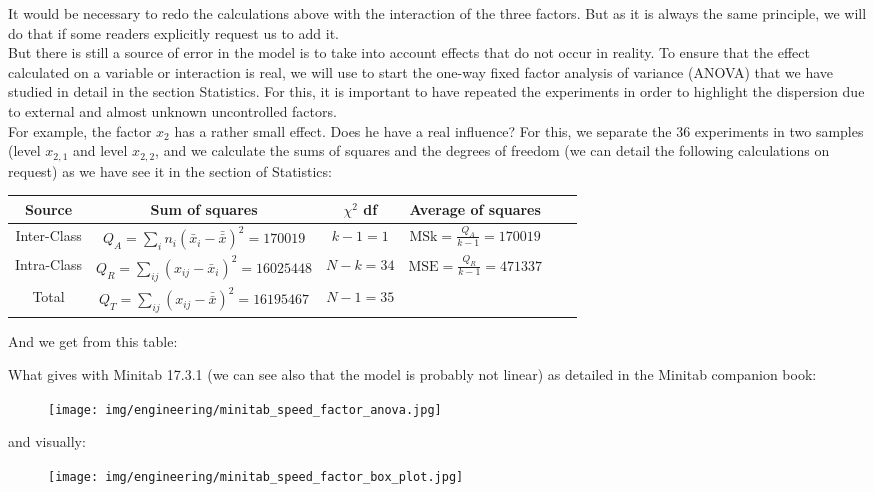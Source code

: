 	It would be necessary to redo the calculations above with the interaction of the three factors. But as it is always the same principle, we will do that if some readers explicitly request us to add it.\\

	But there is still a source of error in the model is to take into account effects that do not occur in reality. To ensure that the effect calculated on a variable or interaction is real, we will use to start the one-way fixed factor analysis of variance (ANOVA) that we have studied in detail in the section Statistics. For this, it is important to have repeated the experiments in order to highlight the dispersion due to external and almost unknown uncontrolled factors.\\

	For example, the factor $x_2$ has a rather small effect. Does he have a real influence? For this, we separate the $36$ experiments in two samples (level $x_{2,1}$ and level $x_{2,2}$, and we calculate the sums of squares and the degrees of freedom (we can detail the following calculations on request) as we have see it in the section of Statistics:
	\begin{table}[H]\small
	\renewcommand{\arraystretch}{1.2}
	\begin{tabular}{cccccc}\hline
	Source & Sum of squares & $\chi^2$ df & Average of squares \\ \hline
	Inter-Class & $Q_A=\displaystyle\sum_{i}n_i\left(\bar{x}_{i}-\bar{\bar{x}}\right)^2=170019$ & $k-1=1$ & $\text{MSk}=\displaystyle\frac{Q_A}{k-1}=170019$ \\
	Intra-Class & $Q_R=\displaystyle\sum_{ij}\left(x_{ij}-\bar{x}_i\right)^2=16025448$ & $N-k=34$ & $ \text{MSE}=\displaystyle\frac{Q_R}{k-1}=471337$ \\
	Total & $Q_T=\displaystyle\sum_{ij}\left(x_{ij}-\bar{\bar{x}}\right)^2=16195467$ & $N-1=35$ & \\ \hline
	\end{tabular}
	\end{table}
	And we get from this table:
	
	What gives with Minitab 17.3.1 (we can see also that the model is probably not linear) as detailed in the Minitab companion book:
	\begin{figure}[H]
		\begin{center}
		\texttt{[image: img/engineering/minitab\_speed\_factor\_anova.jpg]}
		\end{center}	
	\end{figure}
	and visually:
	\begin{figure}[H]
		\begin{center}
		\texttt{[image: img/engineering/minitab\_speed\_factor\_box\_plot.jpg]}
		\end{center}	
	\end{figure}	
	
